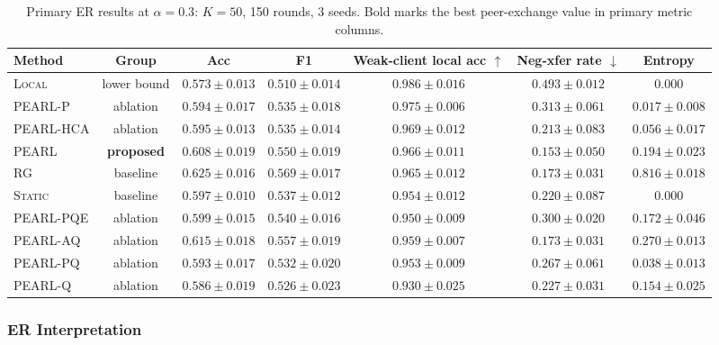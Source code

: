 \documentclass[conference]{IEEEtran}
\begin{document}
\begin{table}[t]
\centering
\caption{Primary ER results at $\alpha=0.3$: $K=50$, 150 rounds, 3 seeds. Bold marks the best peer-exchange value in primary metric columns.}
\label{tab:official_results}
\renewcommand{\arraystretch}{1.18}
\setlength{\tabcolsep}{4pt}
\begin{tabular}{lcccccc}
\toprule
\textbf{Method} & \textbf{Group} & \textbf{Acc} & \textbf{F1} & \textbf{Weak-client local acc} $\uparrow$ & \textbf{Neg-xfer rate} $\downarrow$ & \textbf{Entropy} \\
\midrule
\textsc{Local}                   & lower bound  & $0.573\pm0.013$ & $0.510\pm0.014$ & $0.986\pm0.016$ & $0.493\pm0.012$ & $0.000$ \\
\textsc{PEARL-P}               & ablation     & $0.594\pm0.017$ & $0.535\pm0.018$ & $0.975\pm0.006$ & $0.313\pm0.061$ & $0.017\pm0.008$ \\
\textsc{PEARL-HCA}        & ablation     & $0.595\pm0.013$ & $0.535\pm0.014$ & $0.969\pm0.012$ & $0.213\pm0.083$ & $0.056\pm0.017$ \\
\textsc{PEARL}                   & \textbf{proposed} & $0.608\pm0.019$ & $0.550\pm0.019$ & $\mathbf{0.966\pm0.011}$ & $\mathbf{0.153\pm0.050}$ & $0.194\pm0.023$ \\
\textsc{RG}                  & baseline     & $0.625\pm0.016$ & $0.569\pm0.017$ & $0.965\pm0.012$ & $0.173\pm0.031$ & $0.816\pm0.018$ \\
\textsc{Static}                  & baseline     & $0.597\pm0.010$ & $0.537\pm0.012$ & $0.954\pm0.012$ & $0.220\pm0.087$ & $0.000$ \\
\textsc{PEARL-PQE} & ablation   & $0.599\pm0.015$ & $0.540\pm0.016$ & $0.950\pm0.009$ & $0.300\pm0.020$ & $0.172\pm0.046$ \\
\textsc{PEARL-AQ}               & ablation     & $0.615\pm0.018$ & $0.557\pm0.019$ & $0.959\pm0.007$ & $0.173\pm0.031$ & $0.270\pm0.013$ \\
\textsc{PEARL-PQ}            & ablation     & $0.593\pm0.017$ & $0.532\pm0.020$ & $0.953\pm0.009$ & $0.267\pm0.061$ & $0.038\pm0.013$ \\
\textsc{PEARL-Q}                 & ablation     & $0.586\pm0.019$ & $0.526\pm0.023$ & $0.930\pm0.025$ & $0.227\pm0.031$ & $0.154\pm0.025$ \\
\bottomrule
\end{tabular}
\end{table}

\subsubsection{ER Interpretation}
\label{subsubsec:official-neg-transfer}
\end{document}

